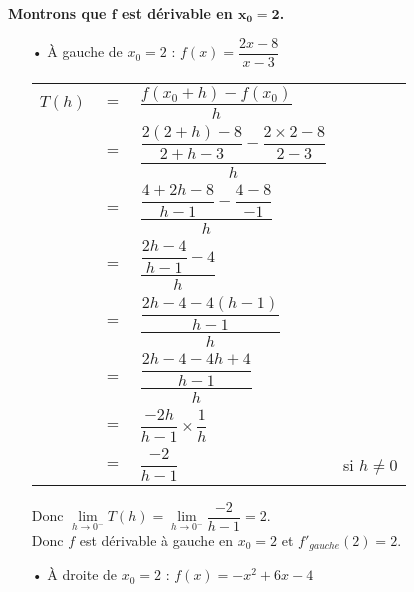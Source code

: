 \newpage

\vspace*{-1.9cm}

\textbf{Montrons que $\mathbf{f}$ est dérivable en $\mathbf{x_0 = 2}$.} \\

\begin{itemize}
\item[•] À gauche de $x_0 = 2$ : $f(x) = \dfrac{2x-8}{x-3}$ \\

\begin{tabular}{llll}
$T(h)$ & $=$ & $\dfrac{f(x_0 + h) - f(x_0)}{h}$ & \vspace*{.3cm} \\
& $=$ & $\dfrac{\dfrac{2\left(2+h\right)-8}{2 + h - 3} - \dfrac{2 \times 2 - 8}{2 - 3}}{h}$ & \vspace*{.3cm} \\
& $=$ & $\dfrac{\dfrac{4 + 2h - 8}{h-1} - \dfrac{4-8}{-1}}{h}$ & \vspace*{.3cm} \\
& $=$ & $\dfrac{\dfrac{2h - 4}{h-1} - 4}{h}$ & \vspace*{.3cm} \\
& $=$ & $\dfrac{\dfrac{2h - 4 -4\left(h-1\right)}{h-1}}{h}$ & \vspace*{.3cm} \\
& $=$ & $\dfrac{\dfrac{2h - 4 - 4h + 4}{h-1}}{h}$ & \vspace*{.3cm} \\
& $=$ & $\dfrac{-2h}{h-1} \times \dfrac{1}{h}$ & \vspace*{.3cm} \\
& $=$ & $\dfrac{-2}{h-1}$ & si $h \neq 0$ \\
\end{tabular}

\vspace*{.3cm}

Donc $\lim\limits_{h \to 0^-} T(h) = \lim\limits_{h \to 0^-} \dfrac{-2}{h-1} = 2$. \\

Donc $f$ est dérivable à gauche en $x_0 = 2$ et $f'_{gauche}\left(2\right) = 2$. \\

\item[•]  À droite de $x_0 = 2$ : $f(x) = -x^2 + 6x - 4$ \\


\end{itemize}
